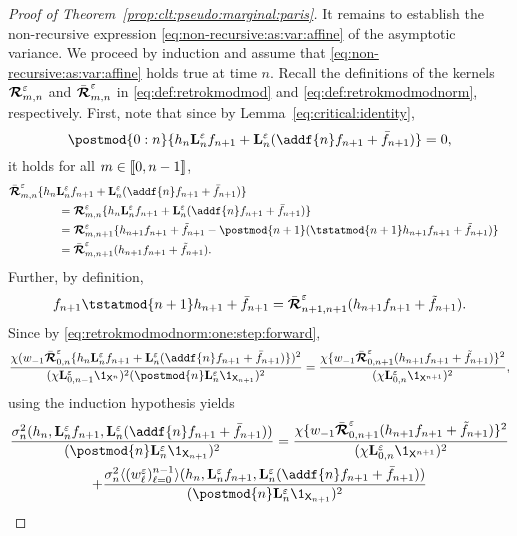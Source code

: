 \begin{proof}[Proof of Theorem~\ref{prop:clt:pseudo:marginal:paris}]
It remains to establish the non-recursive expression \eqref{eq:non-recursive:as:var:affine} of the asymptotic variance. We proceed by induction and assume that \eqref{eq:non-recursive:as:var:affine} holds true at time $n$. Recall the definitions of the kernels $\boldsymbol{\mathcal{R}}^\varepsilon_{m, n}$ and $\bar{\boldsymbol{\mathcal{R}}}^\varepsilon_{m, n}$ in \eqref{eq:def:retrokmodmod} and \eqref{eq:def:retrokmodmodnorm}, respectively. First, note that since by Lemma~\ref{eq:critical:identity}, 
$$
\postmod{0:n} \{h_n \ukmod{n} f_{n + 1} + \ukmod{n}(\addf{n} f_{n + 1} + \bar{f}_{n + 1})\} = 0, 
$$
it holds for all $m \in \llbracket 0, n - 1 \rrbracket$,  
\begin{align} 
\lefteqn{\retrokmodmodnorm_{m, n} \{h_n \ukmod{n} f_{n + 1} + \ukmod{n}(\addf{n} f_{n + 1} + \bar{f}_{n + 1})\}} \hspace{15mm} \nonumber \\
&= \retrokmodmod_{m, n} \{h_n \ukmod{n} f_{n + 1} + \ukmod{n}(\addf{n} f_{n + 1} + \bar{f}_{n + 1})\} \nonumber \\ 
&= \retrokmodmod_{m, n + 1} \{ h_{n + 1} f_{n + 1} + \ftd{n + 1} - \postmod{n + 1}(\tstatmod{n + 1} h_{n + 1} f_{n + 1} + \ftd{n + 1}) \} \nonumber \\
&= \retrokmodmodnorm_{m, n + 1}(h_{n + 1} f_{n + 1} + \ftd{n + 1}). \label{eq:retrokmodmodnorm:one:step:forward}
\end{align}
Further, by definition, 
\begin{equation} \label{eq:tstatmod:vs:retrokmodmodnorm}
f_{n + 1} \tstatmod{n + 1} h_{n + 1} + \bar{f}_{n + 1} = \retrokmodmodnorm_{n + 1, n + 1} (h_{n + 1} f_{n + 1} + \ftd{n + 1}).
\end{equation}
Since by \eqref{eq:retrokmodmodnorm:one:step:forward}, 
$$
\frac{\chi (\initwgtfunc
\retrokmodmodnorm_{0, n}
\{ h_n \ukmod{n} f_{n + 1} + \ukmod{n}(\addf{n} f_{n + 1} + \bar{f}_{n + 1})\} )^2}{(\chi \ukmod{0, n - 1} \1_{\Xset^n})^2 (\postmod{n} \ukmod{n} \1_{\Xset_{n + 1}})^2} = \frac{\chi \{ \initwgtfunc
\retrokmodmodnorm_{0, n + 1}
( h_{n + 1} f_{n + 1} + \ftd{n + 1}) \}^2}{(\chi \ukmod{0, n} \1_{\Xset^{n + 1}})^2}, 
$$
using the induction hypothesis yields   
\begin{multline*}
 \frac{\sigma^2_n(h_n, \ukmod{n} f_{n + 1}, \ukmod{n}(\addf{n} f_{n + 1} + \bar{f}_{n + 1}))}{(\postmod{n} \ukmod{n} \1_{\Xset_{n + 1}})^2} = 
  \frac{\chi \{ \initwgtfunc
  \retrokmodmodnorm_{0, n + 1}
  ( h_{n + 1} f_{n + 1} + \ftd{n + 1}) \}^2}{(\chi \ukmod{0, n} \1_{\Xset^{n + 1}})^2} \\
+ \frac{\sigma^2_n \langle (\wgtfuncmod{\ell})_{\ell = 0}^{n - 1} \rangle(h_n, \ukmod{n} f_{n + 1}, \ukmod{n}(\addf{n} f_{n + 1} + \bar{f}_{n + 1}))}{(\postmod{n} \ukmod{n} \1_{\Xset_{n + 1}})^2} \\

\end{multline*}
\end{proof}
